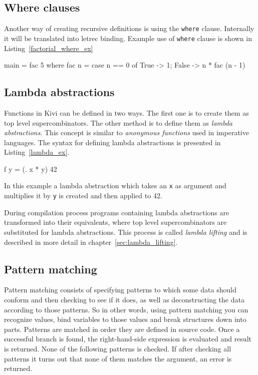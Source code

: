 \documentclass[12pt,a4paper]{report}
\begin{document}
\subsection{Where clauses}
Another way of creating recursive definitions is using the \texttt{where}
clause. Internally it will be translated into letrec binding. Example use of
\texttt{where} clause is shown in Listing~\ref{factorial_where_ex}

\vspace*{0.2in}
\begin{code}[style=haskell,label=factorial_where_ex,caption={Factorial function using \texttt{where}.}]
  main = fac 5
      where
          fac n = case n == 0 of
              True  -> 1;
              False -> n * fac (n - 1)
\end{code}

\subsection{Lambda abstractions}
Functions in Kivi can be defined in two ways. The first one is to create them
as top level supercombinators. The other method is to define them as
\textit{lambda abstractions}. This concept is similar to \textit{anonymous
functions} used in imperative languages. The syntax for defining lambda
abstractions is presented in Listing~\ref{lambda_ex}.

\vspace*{0.2in}
\begin{code}[style=haskell,label=lambda_ex,caption={Lambda abstraction}]
  f y = (\x . x * y) 42
\end{code}

In this example a lambda abstraction which takes an \texttt{x} as argument and
multiplies it by \texttt{y} is created and then applied to 42.

During compilation process programs containing lambda abstractions are
transformed into their equivalents, where top level supercombinators are
substituted for lambda abstractions. This process is called \textit{lambda
lifting} and is described in more detail in chapter~\ref{sec:lambda_lifting}.

\subsection{Pattern matching}

Pattern matching consists of specifying patterns to which some data should
conform and then checking to see if it does, as well as deconstructing the data
according to those patterns. So in other words, using pattern matching you can
recognize values, bind variables to those values and break structures down into
parts.
Patterns are matched in order they are defined in source code. Once a
successful branch is found, the right-hand-side expression is evaluated and
result is returned. None of the following patterns is checked. If after checking
all patterns it turns out that none of them matches the argument, an error is
returned.
\end{document}
